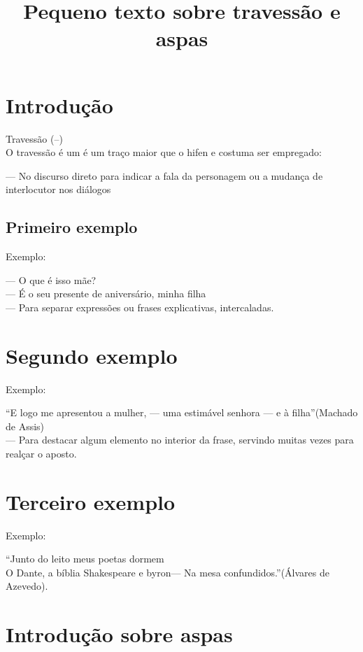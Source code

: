 \documentclass[12pt, article, oneside]{memoir}
\begin{document}
		
		
		\title{ Pequeno texto sobre travessão e aspas}
		\maketitle
		
		\tableofcontents
		\newpage
		\chapter{Introdução}	

		
			
			
		 Travessão (--)\\
		O travessão é um é um traço maior que o hifen e costuma ser empregado:
		
		--- No discurso direto para indicar a fala da personagem ou a mudança de interlocutor nos diálogos
		\section{Primeiro exemplo}
		
		Exemplo:
		
		--- O que é isso mãe?\\
		--- É o seu presente de aniversário, minha filha\\
		--- Para separar expressões ou frases explicativas, intercaladas.\\
		\chapter{Segundo exemplo}
		   Exemplo:
		   
		   ``E logo me apresentou a mulher, --- uma estimável senhora --- e à filha''(Machado de Assis)\\
		   --- Para destacar algum elemento no interior da frase, servindo muitas vezes para realçar o aposto.\\
		   \newpage
		  \chapter{Terceiro exemplo}
		   Exemplo:
		   
		   ``Junto do leito meus poetas dormem\\
		   O Dante, a bíblia Shakespeare e byron--- \newline
		   Na mesa confundidos.''(Álvares de Azevedo).
		   \newpage
		   \chapter{Introdução sobre aspas}
\end{document}
